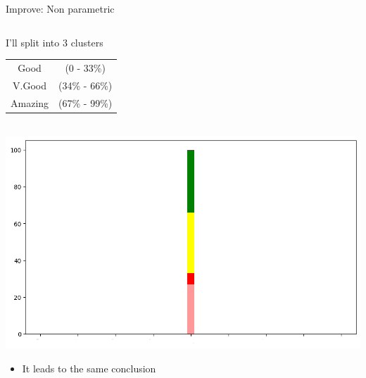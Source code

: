 \documentclass[8pt]{beamer}
\begin{document}
\begin{frame}{Improve: Non parametric}
\begin{columns}
                \begin{column}{.6\textwidth}
                    \begin{center}
                        I'll split into 3 clusters\\
                        \begin{tabular}{|c|c|}
                            \hline
                            Good & (0 - 33\%)\\
                            V.Good & (34\% - 66\%)\\
                            Amazing & (67\% - 99\%)\\
                            \hline
                        \end{tabular}
                        \\[5px]
                        \includegraphics[width=\textwidth]{pics/rank dist.png}
                    \end{center}
                    \begin{itemize}
                        \item It leads to the same conclusion
                    \end{itemize}
                \end{column}
            \end{columns}
        \end{frame}
\end{document}

